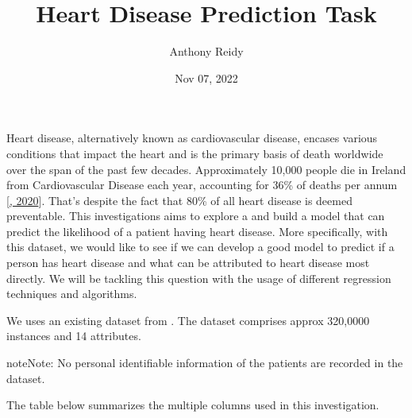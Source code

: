 \documentclass[letterpaper,10pt,english]{jupyterBook}
\title{Heart Disease Prediction Task}
\date{Nov 07, 2022}
\author{Anthony Reidy}
\begin{document}
\pagestyle{empty}
\sphinxmaketitle
\pagestyle{plain}
\sphinxtableofcontents
\pagestyle{normal}
\label{\detokenize{Introduction::doc}}


\sphinxAtStartPar
Heart disease, alternatively known as cardiovascular disease, encases various conditions that impact the heart and is the primary basis of death worldwide over the span of the past few decades. Approximately 10,000 people die in Ireland from Cardiovascular Disease each year, accounting for 36\% of deaths per annum {[}\hyperlink{cite.References:id3}{, 2020}{]}. That’s despite the fact that 80\% of all heart disease is deemed preventable. This investigations aims to explore a  and build a model that can predict the likelihood of a patient having heart disease. More specifically, with this dataset, we would like to see if we can develop a good model to predict if a person has heart disease and what  can be attributed to heart disease most directly. We will be tackling this question with the usage of different regression techniques and algorithms.

\begin{DUlineblock}{0em}
\item[] 
\end{DUlineblock}

\sphinxAtStartPar
We uses an existing dataset from . The dataset comprises approx 320,0000 instances and 14 attributes.

\begin{sphinxadmonition}{note}{Note:}
\sphinxAtStartPar
No personal identifiable information of the patients are recorded in the dataset.
\end{sphinxadmonition}

\sphinxAtStartPar
The table below summarizes the multiple columns used in this investigation.
\end{document}
